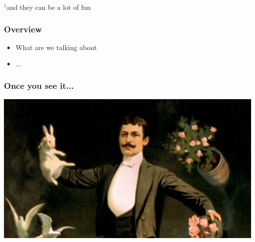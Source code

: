 \titlepage
\vfill
{\footnotesize $^\dagger$and they can be a lot of fun}

\begin{frame}
\frametitle{Overview}
\begin{itemize}
\setlength{\itemsep}{2.5ex}
\item What are we talking about
\item ...
\end{itemize}
\end{frame}

\begin{frame}
\frametitle{Once you see it...}

\begin{center}
  \includegraphics[width=\textwidth]{magician.jpg}
\end{center}

\end{frame}
